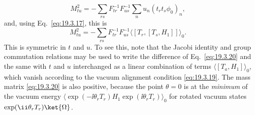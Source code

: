 \[
M_{tu}^2=-\sum_{rs}F_{tr}^{-1}F_{us}^{-1}
\sum_n u_n(t_rt_s\phi_0)_n,
\]
and, using Eq.~\eqref{eq:19.3.17}, this is
\begin{equation}
M_{tu}^2=-\sum_{rs}F_{tr}^{-1}F_{us}^{-1}
\langle[T_r,[T_s,H_1]]\rangle_0.
\tag{19.3.20}\label{eq:19.3.20}
\end{equation}
This is symmetric in $t$ and $u$. To see this, note that the Jacobi identity and group commutation relations may be used to write the difference of Eq.~\eqref{eq:19.3.20} and the same with $t$ and $u$ interchanged as a linear combination of terms $\langle[T_a,H_1]\rangle_0$, which vanish according to the vacuum alignment condition \eqref{eq:19.3.19}. The mass matrix \eqref{eq:19.3.20} is also positive, because the point $\theta=0$ is at the \emph{minimum} of the vacuum energy $\langle\exp(-\ii\theta_rT_r)H_1\exp(\ii\theta_rT_r)\rangle_0$ for rotated vacuum states $\exp(\ii\theta_rT_r)\ket{\Omega}$.
